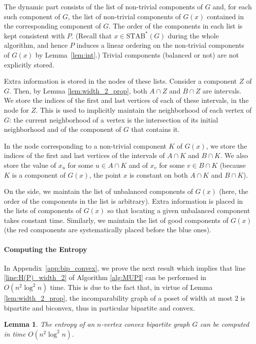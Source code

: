 \documentclass{article} \usepackage{fullpage}
\newtheorem{lemma}{Lemma}
\newcommand{\STAB}{\mathrm{STAB}}
\begin{document}
The dynamic part consists of the list of non-trivial components of $G$ and, for each such component of $G$, the list of non-trivial components of $G(x)$ contained in the corresponding component of $G$. The order of the components in each list is kept consistent with $P$. (Recall that $x\in \STAB^{*}(G)$ during the whole algorithm, and hence $P$ induces a linear ordering on the non-trivial components of $G(x)$ by Lemma~\ref{lem:int}.)  Trivial components (balanced or not) are not explicitly stored. 

Extra information is stored in the nodes of these lists. Consider a component $Z$ of $G$. Then, by Lemma \ref{lem:width_2_prop}, both $A \cap Z$ and $B \cap Z$ are intervals. We store the indices of the first and last vertices of each of these intervals, in the node for $Z$. This is used to implicitly maintain the neighborhood of each vertex of $G$: the current neighborhood of a vertex is the intersection of its initial neighborhood and of the component of $G$ that contains it.

In the node corresponding to a non-trivial component $K$ of $G(x)$, we store the indices of the first and last vertices of the intervals of $A \cap K$ and $B \cap K$. We also store the value of $x_u$ for some $u \in A \cap K$ and of $x_v$ for some $v \in B \cap K$ (because $K$ is a component of $G(x)$, the point $x$ is constant on both $A \cap K$ and $B \cap K$).

On the side, we maintain the list of unbalanced components of $G(x)$ (here, the order of the components in the list is arbitrary). Extra information is placed in the lists of components of $G(x)$ so that locating a given unbalanced component takes constant time. Similarly, we maintain the list of good components of $G(x)$ (the red components are systematically placed before the blue ones).

\paragraph*{Computing the Entropy}

In Appendix~\ref{app:bip_convex}, we prove the next result which implies that line \ref{line:H(P)_width_2} of Algorithm \ref{alg:MUPI} can be performed in $O(n^2 \log^2 n)$ time. This is due to the fact that, in virtue of Lemma \ref{lem:width_2_prop}, the incomparability graph of a poset of width at most $2$ is bipartite and biconvex, thus in particular bipartite and convex.

\begin{lemma}
\label{lem:H(P)_convex}
The entropy of an $n$-vertex convex bipartite graph $G$ can be computed in time $O(n^2 \log^2 n)$. 
\end{lemma}
\end{document}
